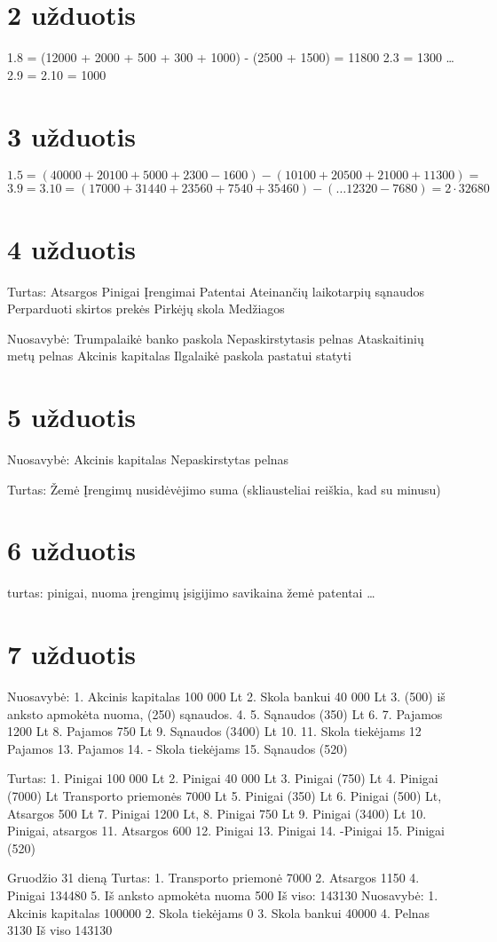 \section{2 užduotis}

1.8 = (12000 + 2000 + 500 + 300 + 1000) - (2500 + 1500) = 11800
2.3 = 1300
…
2.9 = 2.10 = 1000

\section{3 užduotis}

$1.5 = (40000 + 20100 + 5000 + 2300 - 1600) - (10100 + 20500 + 21000 + 11300) = $
$3.9 = 3.10 = (17000 + 31440 + 23560 + 7540 + 35460) - (… 12320  - 7680) = 2 \cdot 32680$

\section{4 užduotis}

Turtas:
Atsargos
Pinigai
Įrengimai
Patentai
Ateinančių laikotarpių sąnaudos
Perparduoti skirtos prekės
Pirkėjų skola
Medžiagos

Nuosavybė:
Trumpalaikė banko paskola
Nepaskirstytasis pelnas
Ataskaitinių metų pelnas
Akcinis kapitalas
Ilgalaikė paskola pastatui statyti

\section{5 užduotis}

Nuosavybė:
Akcinis kapitalas
Nepaskirstytas pelnas

Turtas:
Žemė
Įrengimų nusidėvėjimo suma (skliausteliai reiškia, kad su minusu)

\section{6 užduotis}

turtas:
pinigai,
nuoma
įrengimų įsigijimo savikaina
žemė
patentai
…

\section{7 užduotis}

Nuosavybė:
1. Akcinis kapitalas 100 000 Lt
2. Skola bankui 40 000 Lt
3. (500) iš anksto apmokėta nuoma, (250) sąnaudos.
4.
5. Sąnaudos (350) Lt
6.
7. Pajamos 1200 Lt
8. Pajamos 750 Lt
9. Sąnaudos (3400) Lt
10.
11. Skola tiekėjams
12 Pajamos
13. Pajamos
14. - Skola tiekėjams
15. Sąnaudos (520)

Turtas:
1. Pinigai 100 000 Lt
2. Pinigai 40 000 Lt
3. Pinigai (750) Lt
4. Pinigai (7000) Lt Transporto priemonės 7000 Lt
5. Pinigai (350) Lt
6. Pinigai (500) Lt, Atsargos 500 Lt
7. Pinigai 1200 Lt,
8. Pinigai 750 Lt
9. Pinigai (3400) Lt
10. Pinigai, atsargos
11. Atsargos 600
12. Pinigai
13. Pinigai
14. -Pinigai
15. Pinigai (520)

Gruodžio 31 dieną
Turtas:
1. Transporto priemonė 7000
2. Atsargos 1150
4. Pinigai 134480
5. Iš anksto apmokėta nuoma 500
Iš viso: 143130
Nuosavybė:
1. Akcinis kapitalas 100000
2. Skola tiekėjams 0
3. Skola bankui 40000
4. Pelnas 3130
Iš viso 143130
